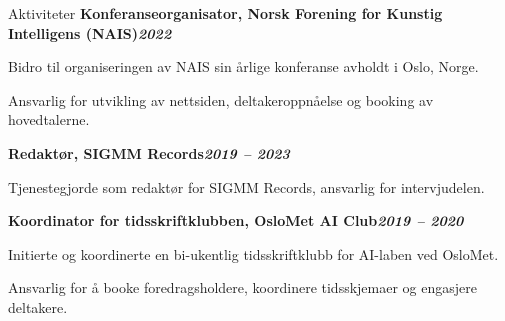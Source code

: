 \begin{rubric}{Aktiviteter}
%
\entry*[]%
\textbf{Konferanseorganisator, Norsk Forening for Kunstig Intelligens (NAIS)\hfill\textit{2022}} \par
\begin{compactitem}
    \item Bidro til organiseringen av NAIS sin årlige konferanse avholdt i Oslo, Norge.
    \item Ansvarlig for utvikling av nettsiden, deltakeroppnåelse og booking av hovedtalerne.
    \vspace{-12pt}
\end{compactitem}
%
\entry*[]%
\textbf{Redaktør, SIGMM Records\hfill\textit{2019 -- 2023}} \par
\begin{compactitem}
    \item Tjenestegjorde som redaktør for SIGMM Records, ansvarlig for intervjudelen.
    \vspace{-12pt}
\end{compactitem}
%
\entry*[]%
\textbf{Koordinator for tidsskriftklubben, OsloMet AI Club\hfill\textit{2019 -- 2020}} \par
\begin{compactitem}
    \item Initierte og koordinerte en bi-ukentlig tidsskriftklubb for AI-laben ved OsloMet.
    \item Ansvarlig for å booke foredragsholdere, koordinere tidsskjemaer og engasjere deltakere.
    \vspace{-12pt}
\end{compactitem}
\end{rubric}

